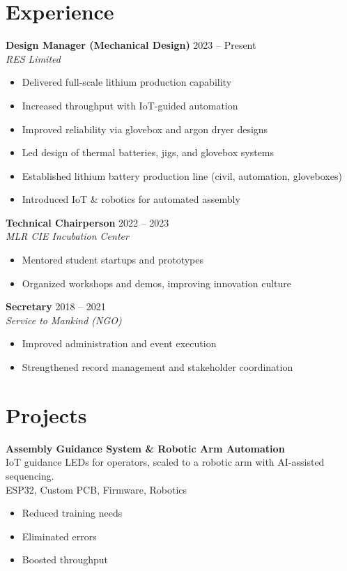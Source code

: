\documentclass[11pt,a4paper]{article}
\begin{document}
\section*{Experience}
\textbf{Design Manager (Mechanical Design)} \hfill 2023 – Present \\ \textit{RES Limited}
\begin{itemize}
\item Delivered full-scale lithium production capability
\item Increased throughput with IoT-guided automation
\item Improved reliability via glovebox and argon dryer designs
\item Led design of thermal batteries, jigs, and glovebox systems
\item Established lithium battery production line (civil, automation, gloveboxes)
\item Introduced IoT \& robotics for automated assembly
\end{itemize}


\textbf{Technical Chairperson} \hfill 2022 – 2023 \\ \textit{MLR CIE Incubation Center}
\begin{itemize}
\item Mentored student startups and prototypes
\item Organized workshops and demos, improving innovation culture
\end{itemize}


\textbf{Secretary} \hfill 2018 – 2021 \\ \textit{Service to Mankind (NGO)}
\begin{itemize}
\item Improved administration and event execution
\item Strengthened record management and stakeholder coordination
\end{itemize}


\section*{Projects}
\textbf{Assembly Guidance System \& Robotic Arm Automation} \\ IoT guidance LEDs for operators, scaled to a robotic arm with AI-assisted sequencing. \\ \textcolor{muted}{ESP32, Custom PCB, Firmware, Robotics}
\begin{itemize}
  \item Reduced training needs
  \item Eliminated errors
  \item Boosted throughput
\end{itemize}
\end{document}
